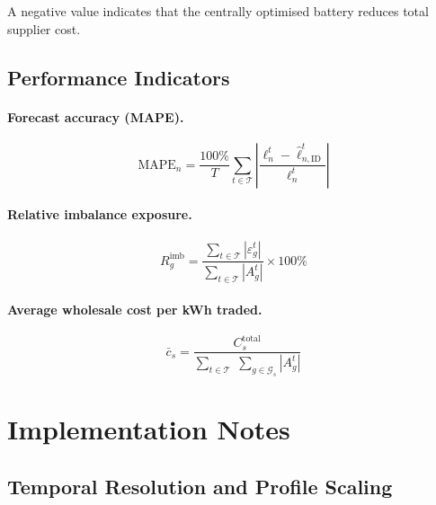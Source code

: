\documentclass[12pt,a4paper]{article}
\begin{document}
A negative value indicates that the centrally optimised battery reduces total
supplier cost.

\subsection{Performance Indicators}

\paragraph{Forecast accuracy (MAPE).}

\begin{equation}
\mathrm{MAPE}_{n} = \frac{100\%}{T}
  \sum_{t \in \mathcal{T}}
  \left|\frac{\ell_{n}^{t} - \hat{\ell}_{n,\mathrm{ID}}^{t}}{\ell_{n}^{t}}\right|
\label{eq:mape}
\end{equation}

\paragraph{Relative imbalance exposure.}

\begin{equation}
R_{g}^{\mathrm{imb}} =
  \frac{\displaystyle\sum_{t \in \mathcal{T}} |\varepsilon_{g}^{t}|}
       {\displaystyle\sum_{t \in \mathcal{T}} |A_{g}^{t}|}
  \times 100\%
\label{eq:rel_imbalance}
\end{equation}

\paragraph{Average wholesale cost per kWh traded.}

\begin{equation}
\bar{c}_{s} =
  \frac{C_{s}^{\mathrm{total}}}
       {\displaystyle\sum_{t \in \mathcal{T}}\;\sum_{g \in \mathcal{G}_{s}} |A_{g}^{t}|}
\label{eq:avg_cost}
\end{equation}

\section{Implementation Notes}

\subsection{Temporal Resolution and Profile Scaling}
\end{document}
